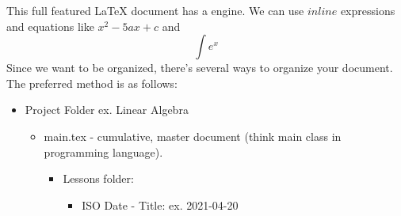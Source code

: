 \markdownRendererUlBegin
\markdownRendererUlItem This full featured LaTeX document has a  engine.\markdownRendererUlItemEnd 
\markdownRendererUlItem We can use $inline$ expressions and equations like $x^2-5ax+c$ and $$\int e^x$$\markdownRendererUlItemEnd 
\markdownRendererUlEnd \markdownRendererInterblockSeparator
{}\markdownRendererInterblockSeparator
{}Since we want to be organized, there's several ways to organize your document. The preferred method is as follows:\markdownRendererInterblockSeparator
{}\begin{itemize}\markdownRendererInterblockSeparator
{}\item Project Folder ex. Linear Algebra \begin{itemize} \item main.tex - cumulative, master document (think main class in programming language). \begin{itemize} \item Lessons folder: \begin{itemize} \item ISO Date - Title: ex. 2021-04-20 \end{itemize} \end{itemize} \end{itemize} \end{itemize}\relax